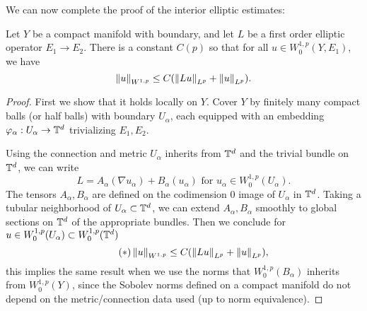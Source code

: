 We can now complete the proof of the interior elliptic estimates:
\begin{thm}
  Let $Y$ be a compact manifold with boundary, and let $L$ be a first
  order elliptic operator $E_{1}\to E_{2}$. There is a constant $C(p)$
  so that for all $u\in
  W^{1,p}_{0}(Y,E_{1})$, we have
  \begin{equation*}
    \left\lVert u\right\rVert_{W^{1,p}}\le C(\left\lVert Lu\right\rVert_{L^{p}}+\left\lVert u\right\rVert_{L^{p}}).
  \end{equation*}
\end{thm}
\begin{proof}
  First we show that it holds locally on $Y$. Cover $Y$ by finitely many compact
  balls (or half balls) with boundary $U_{\alpha}$, each equipped with an embedding
  $\varphi_{\alpha}:U_{\alpha}\to \mathbb{T}^{d}$ trivializing $E_{1},E_{2}$.

  Using the connection and metric $U_{\alpha}$ inherits from
  $\mathbb{T}^{d}$ and the trivial bundle on $\mathbb{T}^{d}$, we can write
  \begin{equation*}
    L=A_{\alpha}(\nabla u_{\alpha})+B_{\alpha}(u_{\alpha})\text{ for
      $u_{\alpha}\in W^{1,p}_{0}(U_{\alpha})$.}
  \end{equation*}
  The tensors $A_{\alpha},B_{\alpha}$ are defined on the codimension
  $0$ image of $U_{\alpha}$ in $\mathbb{T}^{d}$. Taking a tubular
  neighborhood of $U_{\alpha}\subset \mathbb{T}^{d}$, we can extend
  $A_{\alpha},B_{\alpha}$ smoothly to global sections on $\mathbb{T}^{d}$ of the appropriate
  bundles. Then we conclude for $u\in W^{1,p}_{0}(U_{\alpha})\subset W^{1,p}_{0}(\mathbb{T}^{d})$ 
  \begin{equation*}\tag{$\ast$}
    \left\lVert u\right\rVert_{W^{1,p}}\le C(\left\lVert Lu\right\rVert_{L^{p}}+\left\lVert u\right\rVert_{L^{p}}),
  \end{equation*}
  this implies the same result when we use the norms that
  $W^{1,p}_{0}(B_{\alpha})$ inherits from $W^{1,p}_{0}(Y)$, since the
  Sobolev norms defined on a compact manifold do not depend on the
  metric/connection data used (up to norm equivalence).


\end{proof}

